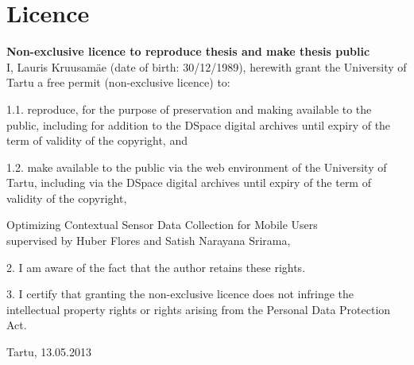\documentclass[oneside,a4paper,12pt]{Latex/Classes/PhDthesisPSnPDF}
\begin{document}
\backmatter

\newpage

\chapter{Licence}

\textbf{Non-exclusive licence to reproduce thesis and make thesis public}\\

I, Lauris Kruusamäe (date of birth: 30/12/1989), herewith grant the University of Tartu a free permit (non-exclusive licence) to: 

1.1. reproduce, for the purpose of preservation and making available to the public, including for addition to the DSpace digital archives until expiry of the term of validity of the copyright, and

1.2. make available to the public via the web environment of the University of Tartu, including via the DSpace digital archives until expiry of the term of validity of the copyright,

\begin{center}
Optimizing Contextual Sensor Data Collection for Mobile Users\\
supervised by Huber Flores and Satish Narayana Srirama,
\end{center}

2. I am aware of the fact that the author retains these rights.

3. I certify that granting the non-exclusive licence does not infringe the intellectual property rights or rights arising from the Personal Data Protection Act. 

\begin{center}
\vspace{3cm}
Tartu, 13.05.2013
\end{center}
\newpage




\end{document}
